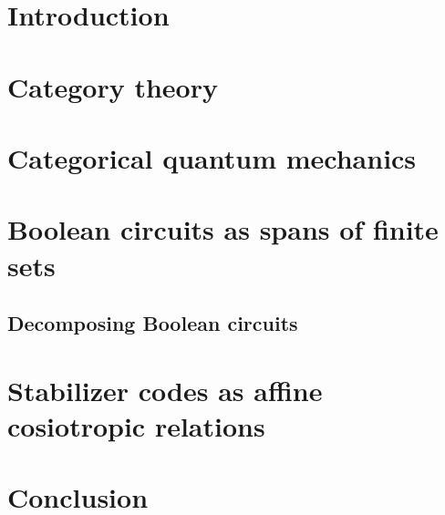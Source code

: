 \documentclass[12pt]{ociamthesis}  %
\begin{document}
\tableofcontents

\chapter{Introduction}
\label{chap:intro}


\chapter{Category theory}
\label{chap:background}





\chapter{Categorical quantum mechanics}


\chapter{Boolean circuits as spans of finite sets}
\label{chap:zxa}


\section{Decomposing Boolean circuits}
\label{sec:dist}


\chapter{Stabilizer codes as affine cosiotropic relations}
\label{chap:stab}


%

\chapter{Conclusion}
\label{chap:conclusion}




\end{document}

